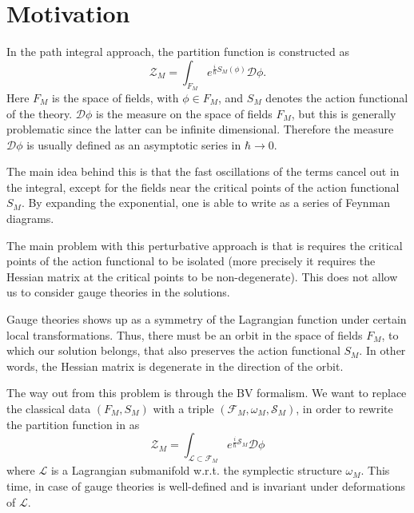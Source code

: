 \section{Motivation}
\label{sec:motivation}

In the path integral approach, the partition function is constructed as 
\begin{equation}
\label{eq:parti_func}
    \mathcal{Z}_M = \int_{F_M} e^{\frac{i}{\hbar}S_M(\phi)} \mathcal{D}\phi .
\end{equation}
Here $F_M$ is the space of fields, with $\phi \in F_M$, and $S_M$ denotes the action functional of the theory.
$\mathcal{D} \phi$ is the measure on the space of fields $F_M$, but this is generally problematic since the latter can be infinite dimensional.
Therefore the measure $\mathcal{D} \phi$ is usually defined as an asymptotic series in $\hbar \rightarrow 0$.

The main idea behind this is that the fast oscillations of the terms cancel out in the integral, except for the fields near the critical points of the action functional $S_M$.
By expanding the exponential, one is able to write  as a series of Feynman diagrams.

The main problem with this perturbative approach is that is requires the critical points of the action functional to be isolated (more precisely it requires the Hessian matrix at the critical points to be non-degenerate).
This does not allow us to consider gauge theories in the solutions.

Gauge theories shows up as a symmetry of the Lagrangian function under certain local transformations.
Thus, there must be an orbit in the space of fields $F_M$, to which our solution belongs, that also preserves the action functional $S_M$.
In other words, the Hessian matrix is degenerate in the direction of the orbit.

The way out from this problem is through the BV formalism.
We want to replace the classical data $(F_M, S_M)$ with a triple $(\mathcal{F}_M, \omega_M, \mathcal{S}_M)$, in order to rewrite the partition function in   as
\begin{equation}
\label{eq:part_func_M}
    \mathcal{Z}_M = \int_{\mathcal{L} \subset \mathcal{F}_M} e^{\frac{i}{\hbar} \mathcal{S}_M} \mathcal{D} \phi
\end{equation}
where $\mathcal{L}$ is a Lagrangian submanifold w.r.t. the symplectic structure $\omega_M$.
This time, in case of gauge theories  is well-defined and is invariant under deformations of $\mathcal{L}$.